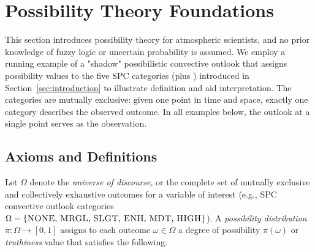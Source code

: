 
\section{Possibility Theory Foundations}\label{sec:poss_primer}

This section introduces possibility theory for
atmospheric scientists, and no prior knowledge of fuzzy logic or
uncertain probability is assumed.
We employ a running example of a "shadow"
possibilistic convective outlook that assigns
possibility values to the five SPC categories
(plus ) introduced in
Section~\ref{sec:introduction} to illustrate
definition and aid interpretation.
The categories are mutually exclusive:
given one point in time and space,
exactly one category describes the observed
outcome.
In all examples below,
the outlook at a single point serves as
the observation.

\subsection{Axioms and Definitions}\label{sec:poss_axioms}

Let $\Omega$ denote the
\textit{universe of discourse},
or the complete set of mutually exclusive and
collectively exhaustive outcomes for a
variable of interest
(e.g., SPC convective outlook categories
$\Omega = \{\textsc{NONE},\, \textsc{MRGL},\, \textsc{SLGT},\, \textsc{ENH},\,
\textsc{MDT},\, \textsc{HIGH}\}$). A \textit{possibility distribution}
$\pi: \Omega \to [0,1]$\allowbreak{} assigns to each
outcome $\omega \in \Omega$\allowbreak{} a degree of
possibility $\pi(\omega)$ or \textit{truthiness}
value that satisfies the following.

